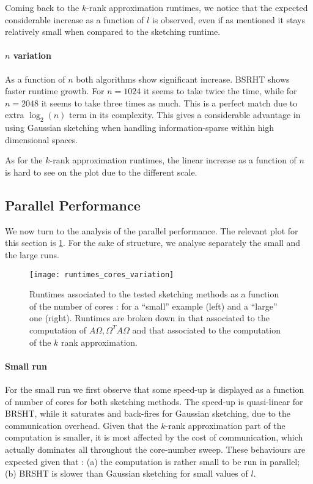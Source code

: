 \documentclass[a4paper, 12pt,oneside]{article}
\begin{document}
		Coming back to the $k$-rank approximation runtimes, we notice that the expected considerable increase as a function of $l$ is observed, even if as mentioned it stays relatively small when compared to the sketching runtime.
		\paragraph{$n$ variation}
		As a function of $n$ both algorithms show significant increase. BSRHT shows faster runtime growth. For $n=1024$ it seems to take twice the time, while for $n=2048$ it seems to take three times as much. This is a perfect match due to extra $\log_2(n)$ term in its complexity. This gives a considerable advantage in using Gaussian sketching when handling information-sparse within high dimensional spaces.

		As for the $k$-rank approximation runtimes, the linear increase as a function of $n$ is hard to see on the plot due to the different scale. 
        \subsection{Parallel Performance}
			We now turn to the analysis of the parallel performance. The relevant plot for this section is \ref{fig:runtimes-cores-variation}. For the sake of structure, we analyse separately the small and the large runs.
			\begin{figure}[htb]       
				\centering             
					\vspace{0em}
					\texttt{[image: runtimes\_cores\_variation]}
					\caption{Runtimes associated to the tested sketching methods as a function of the number of cores : for a ``small'' example (left) and a ``large'' one (right). Runtimes are broken down in that associated to the computation of $A\Omega,\Omega^T A\Omega$ and that associated to the computation of the $k$ rank approximation.}
					\label{fig:runtimes-cores-variation}
			\end{figure}
			\paragraph{Small run}
			For the small run we first observe that some speed-up is displayed as a function of number of cores for both sketching methods. The speed-up is quasi-linear for BRSHT, while it saturates and back-fires for Gaussian sketching, due to the communication overhead. Given that the $k$-rank approximation part of the computation is smaller, it is most affected by the cost of communication, which actually dominates all throughout the core-number sweep.   
			These behaviours are expected given that : (a) the computation is rather small to be run in parallel; (b) BRSHT is slower than Gaussian sketching for small values of $l$. 
			
\end{document}

